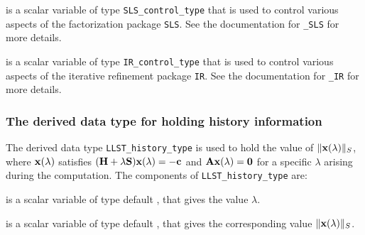 \documentclass{galahad}
\newcommand{\packagename}{LLST}
\begin{document}
\begin{description}
 is a scalar variable of type
{\tt SLS\_control\_type} that is used to control various aspects of the
factorization package {\tt SLS}. See the documentation for
{\tt \libraryname\_SLS} for more details.

 is a scalar variable of type
{\tt IR\_control\_type} that is used to control various aspects of the
iterative refinement package {\tt IR}. See the documentation for
{\tt \libraryname\_IR} for more details.

\end{description}


\subsubsection{The derived data type for holding history
 information}\label{typehist}
The derived data type
{\tt \packagename\_history\_type}
is used to hold the value of $\|{\mathbf{x}}(\lambda)\|_S$, where
${\mathbf{x}}(\lambda)$ satisfies
$({\mathbf{H}} + \lambda {\mathbf{S}}){\mathbf{x}}(\lambda) = - {\mathbf{c}}$ and ${\mathbf{A}}{\mathbf{x}}(\lambda) = {\mathbf{0}}$
for a specific $\lambda$ arising during the computation.
The components of
{\tt \packagename\_history\_type}
are:
\begin{description}
 is a scalar variable of type default \realdp, that gives
 the value $\lambda$.

 is a scalar variable of type default \real, that gives
 the corresponding value $\|{\mathbf{x}}(\lambda)\|_S$.

\end{description}

\end{document}
